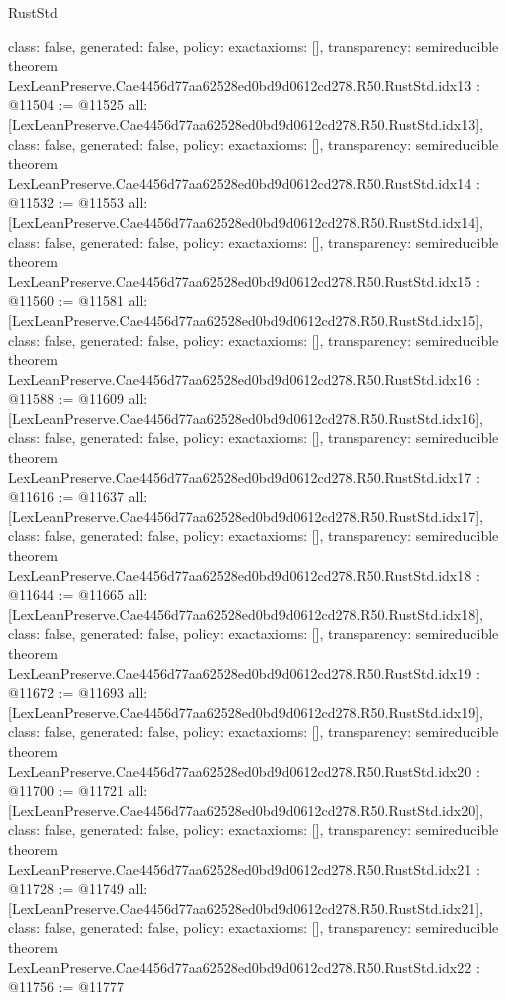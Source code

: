\begin{lexlean}{RustStd}
\begin{coremodule}
{  class: false,
  generated: false,
  policy: exact{axioms: []},
  transparency: semireducible
}
theorem LexLeanPreserve.Cae4456d77aa62528ed0bd9d0612cd278.R50.RustStd.idx13 : @11504 := @11525 {
  all: [LexLeanPreserve.Cae4456d77aa62528ed0bd9d0612cd278.R50.RustStd.idx13],
  class: false,
  generated: false,
  policy: exact{axioms: []},
  transparency: semireducible
}
theorem LexLeanPreserve.Cae4456d77aa62528ed0bd9d0612cd278.R50.RustStd.idx14 : @11532 := @11553 {
  all: [LexLeanPreserve.Cae4456d77aa62528ed0bd9d0612cd278.R50.RustStd.idx14],
  class: false,
  generated: false,
  policy: exact{axioms: []},
  transparency: semireducible
}
theorem LexLeanPreserve.Cae4456d77aa62528ed0bd9d0612cd278.R50.RustStd.idx15 : @11560 := @11581 {
  all: [LexLeanPreserve.Cae4456d77aa62528ed0bd9d0612cd278.R50.RustStd.idx15],
  class: false,
  generated: false,
  policy: exact{axioms: []},
  transparency: semireducible
}
theorem LexLeanPreserve.Cae4456d77aa62528ed0bd9d0612cd278.R50.RustStd.idx16 : @11588 := @11609 {
  all: [LexLeanPreserve.Cae4456d77aa62528ed0bd9d0612cd278.R50.RustStd.idx16],
  class: false,
  generated: false,
  policy: exact{axioms: []},
  transparency: semireducible
}
theorem LexLeanPreserve.Cae4456d77aa62528ed0bd9d0612cd278.R50.RustStd.idx17 : @11616 := @11637 {
  all: [LexLeanPreserve.Cae4456d77aa62528ed0bd9d0612cd278.R50.RustStd.idx17],
  class: false,
  generated: false,
  policy: exact{axioms: []},
  transparency: semireducible
}
theorem LexLeanPreserve.Cae4456d77aa62528ed0bd9d0612cd278.R50.RustStd.idx18 : @11644 := @11665 {
  all: [LexLeanPreserve.Cae4456d77aa62528ed0bd9d0612cd278.R50.RustStd.idx18],
  class: false,
  generated: false,
  policy: exact{axioms: []},
  transparency: semireducible
}
theorem LexLeanPreserve.Cae4456d77aa62528ed0bd9d0612cd278.R50.RustStd.idx19 : @11672 := @11693 {
  all: [LexLeanPreserve.Cae4456d77aa62528ed0bd9d0612cd278.R50.RustStd.idx19],
  class: false,
  generated: false,
  policy: exact{axioms: []},
  transparency: semireducible
}
theorem LexLeanPreserve.Cae4456d77aa62528ed0bd9d0612cd278.R50.RustStd.idx20 : @11700 := @11721 {
  all: [LexLeanPreserve.Cae4456d77aa62528ed0bd9d0612cd278.R50.RustStd.idx20],
  class: false,
  generated: false,
  policy: exact{axioms: []},
  transparency: semireducible
}
theorem LexLeanPreserve.Cae4456d77aa62528ed0bd9d0612cd278.R50.RustStd.idx21 : @11728 := @11749 {
  all: [LexLeanPreserve.Cae4456d77aa62528ed0bd9d0612cd278.R50.RustStd.idx21],
  class: false,
  generated: false,
  policy: exact{axioms: []},
  transparency: semireducible
}
theorem LexLeanPreserve.Cae4456d77aa62528ed0bd9d0612cd278.R50.RustStd.idx22 : @11756 := @11777 {
}
\end{coremodule}
\end{lexlean}
